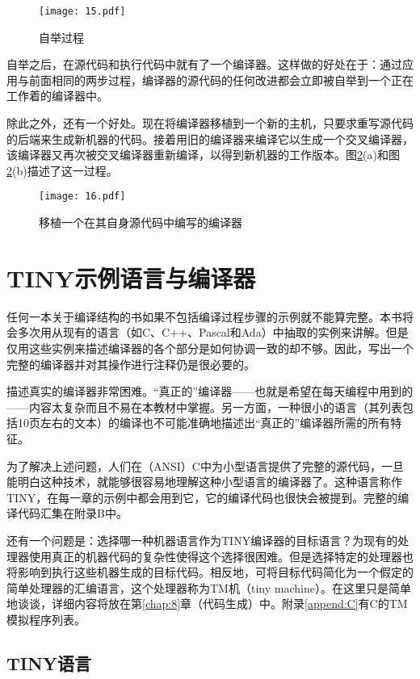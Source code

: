 \documentclass[lang=cn,10pt]{elegantbook}
\begin{document}
\begin{figure}[htbp]
  \centering
  \texttt{[image: 15.pdf]}
  \caption{自举过程}
  \label{fig:1-2}
\end{figure}

自举之后，在源代码和执行代码中就有了一个编译器。这样做的好处在于：通过应用与前面相同的两步过程，编译器的源代码的任何改进都会立即被自举到一个正在工作着的编译器中。

除此之外，还有一个好处。现在将编译器移植到一个新的主机，只要求重写源代码的后端来生成新机器的代码。接着用旧的编译器来编译它以生成一个交叉编译器，该编译器又再次被交叉编译器重新编译，以得到新机器的工作版本。图\ref{fig:1-3}(a)和图\ref{fig:1-3}(b)描述了这一过程。

\begin{figure}[htbp]
  \centering
  \texttt{[image: 16.pdf]}
  \caption{移植一个在其自身源代码中编写的编译器}
  \label{fig:1-3}
\end{figure}

\section{TINY示例语言与编译器}
\label{sec:1-7}

任何一本关于编译结构的书如果不包括编译过程步骤的示例就不能算完整。本书将会多次用从现有的语言（如C、C++、Pascal和Ada）中抽取的实例来讲解。但是仅用这些实例来描述编译器的各个部分是如何协调一致的却不够。因此，写出一个完整的编译器并对其操作进行注释仍是很必要的。

描述真实的编译器非常困难。“真正的”编译器——也就是希望在每天编程中用到的——内容太复杂而且不易在本教材中掌握。另一方面，一种很小的语言（其列表包括10页左右的文本）的编译也不可能准确地描述出“真正的”编译器所需的所有特征。

为了解决上述问题，人们在（ANSI）C中为小型语言提供了完整的源代码，一旦能明白这种技术，就能够很容易地理解这种小型语言的编译器了。这种语言称作TINY，在每一章的示例中都会用到它，它的编译代码也很快会被提到。完整的编译代码汇集在附录B中。

还有一个问题是：选择哪一种机器语言作为TINY编译器的目标语言？为现有的处理器使用真正的机器代码的复杂性使得这个选择很困难。但是选择特定的处理器也将影响到执行这些机器生成的目标代码。相反地，可将目标代码简化为一个假定的简单处理器的汇编语言，这个处理器称为TM机（tiny machine）。在这里只是简单地谈谈，详细内容将放在第\ref{chap:8}章（代码生成）中。附录\ref{append:C}有C的TM模拟程序列表。

\subsection{TINY语言}
\label{subsec:1-7-1}
\end{document}
